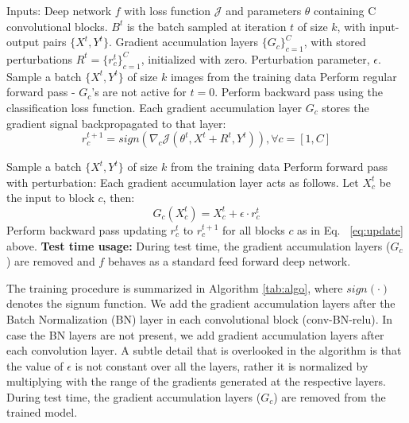 \documentclass[letterpaper]{article} %
\begin{document}
\begin{algorithm*}[!htb]
\caption{Efficient layerwise adversarial training procedure for improved regularization}\label{alg:algo}
\label{tab:algo}
\begin{algorithmic}[1]
\State Inputs: Deep network $f$ with loss function $\mathcal{J}$ and parameters $\theta$ containing C convolutional blocks. ${B^t}$ is the batch sampled at iteration $t$ of size $k$, with input-output pairs $\{X^{t},Y^{t}\}$. Gradient accumulation layers $\{G_c\}_{c=1}^{C}$, with stored perturbations $R^t=\{r^{t}_c\}_{c=1}^{C}$, initialized with zero. Perturbation parameter, $\epsilon$.
		\State Sample a batch $\{X^t,Y^t\}$ of size $k$ images from the training data
        \State Perform regular forward pass - $G_c$'s are not active for $t=0$.
        \State Perform backward pass using the classification loss function. Each gradient accumulation layer $G_{c}$ stores the gradient signal backpropagated to that layer:
        \begin{equation}
        r^{t+1}_c = sign(\nabla_{c}\mathcal{J}(\theta^t,X^t+R^t,Y^t)),  \forall c = [1,C]
        \label{eq:update}
        \end{equation}
		
		\State Sample a batch $\{X^t,Y^t\}$ of size $k$ from the training data
        \State Perform forward pass with perturbation: Each gradient accumulation layer acts as follows. \noindent Let $X^{t}_{c}$ be the input to block $c$, then:
        \begin{equation}
        		G_c(X^{t}_{c})=X^{t}_{c}+\epsilon \cdot r^{t}_c
         \end{equation}
        \State Perform backward pass updating $r^{t}_c$ to $r^{t+1}_c$ for all blocks $c$ as in Eq. ~\ref{eq:update} above.
\EndFor
\State \textbf{Test time usage:} During test time, the gradient accumulation layers ($G_c$) are removed and $f$ behaves as a standard feed forward deep network.
\end{algorithmic}
\end{algorithm*}

 The training procedure is summarized in Algorithm \ref{tab:algo}, where $sign(\cdot)$ denotes the signum function. We add the gradient accumulation layers after the Batch Normalization (BN) layer in each convolutional block (conv-BN-relu). In case the BN layers are not present, we add gradient accumulation layers after each convolution layer. A subtle detail that is overlooked in the algorithm is that the value of $\epsilon$ is not constant over all the layers, rather it is normalized by multiplying with the range of the gradients generated at the respective layers. During test time, the gradient accumulation layers ($G_c$) are removed from the trained model.
 
\end{document}
